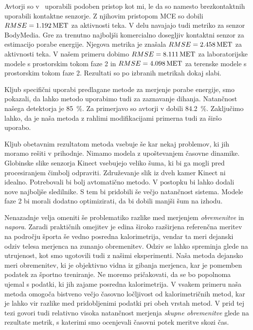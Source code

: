 Avtorji so v~\cite{gjoreski2015context} uporabili podoben pristop kot mi, le da so namesto brezkontaktnih uporabili kontaktne senzorje. Z njihovim pristopom MCE so dobili ${RMSE}=\SI{1.192}{MET}$ za aktivnosti teka. V delu navajajo tudi metriko za senzor BodyMedia. Gre za trenutno najboljši komercialno dosegljiv kontaktni senzor za estimacijo porabe energije. Njegova metrika je znašala ${RMSE}=\SI{2.458}{MET}$ za aktivnosti teka. V našem primeru dobimo ${RMSE}=\SI{8.111}{MET}$ za laboratorijske modele s prostorskim tokom faze 2 in ${RMSE}=\SI{4.098}{MET}$ za terenske modele s prostorskim tokom faze 2. Rezultati so po izbranih metrikah dokaj slabi. 

Kljub specifični uporabi predlagane metode za merjenje porabe energije, smo pokazali, da lahko metodo uporabimo tudi za zaznavanje dihanja. Natančnost našega detektorja je \SI{85}{\%}. Za primerjavo so avtorji v \cite{nakajima2001development} dobili \SI{84.2}{\%}. Zaključimo lahko, da je naša metoda z rahlimi modifikacijami primerna tudi za širšo uporabo.

Kljub obetavnim rezultatom metoda vsebuje še kar nekaj problemov, ki jih moramo rešiti v prihodnje. Nimamo modela z upoštevanjem časovne dinamike. Globinske slike senzorja Kinect vsebujejo veliko šuma, ki bi ga mogli pred procesiranjem čimbolj odpraviti. Združevanje slik iz dveh kamer Kinect ni idealno. Potrebovali bi bolj avtomatično metodo. V postopku bi lahko dodali nove najboljše sledilnike. S tem bi pridobili še večjo natančnost sistema. Modele faze 2 bi morali dodatno optimizirati, da bi dobili manjši šum na izhodu.

Nenazadnje velja omeniti še problematiko razlike med merjenjem \emph{obremenitve} in \emph{napora}. Zaradi praktičnih omejitev je edina široko razširjena referenčna meritev na področju športa še vedno posredna kalorimetrija, vendar ta meri dejanski odziv telesa merjenca na zunanjo obremenitev. Odziv se lahko spreminja glede na utrujenost, kot smo ugotovili tudi z našimi eksperimenti. Naša metoda dejansko meri obremenitev, ki je objektivno vidna iz gibanja merjenca, kar je pomemben podatek za športno treniranje. Ne moremo pričakovati, da se bo popolnoma ujemal s podatki, ki jih zajame posredna kalorimetrija. V vsakem primeru naša metoda omogoča bistveno večjo časovno ločljivost od kalorimetričnih metod, kar je lahko vir razlike med pridobljenimi podatki pri obeh vrstah metod. V prid tej tezi govori tudi relativno visoka natančnost merjenja \emph{skupne obremenitve} glede na rezultate metrik, s katerimi smo ocenjevali časovni potek meritve skozi čas.